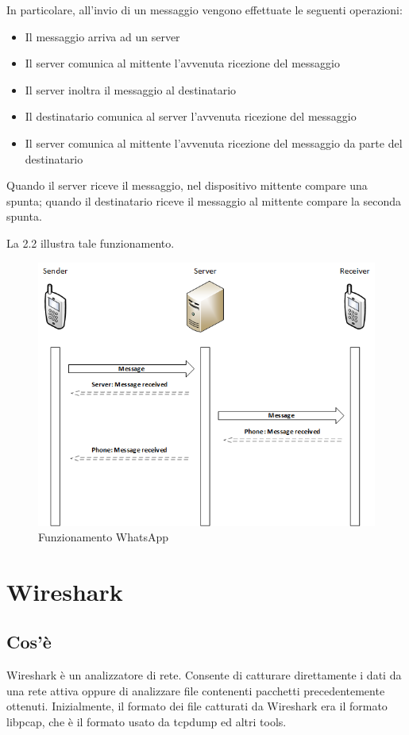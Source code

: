 \documentclass[a4paper,11pt]{book}
\begin{document}
In particolare, all'invio di un messaggio vengono effettuate le seguenti operazioni:
\begin{itemize}
 \item Il messaggio arriva ad un server
 \item Il server comunica al mittente l'avvenuta ricezione del messaggio
 \item Il server inoltra il messaggio al destinatario
 \item Il destinatario comunica al server l'avvenuta ricezione del messaggio
 \item Il server comunica al mittente l'avvenuta ricezione del messaggio da parte del destinatario
\end{itemize}

Quando il server riceve il messaggio, nel dispositivo mittente compare una spunta; quando il destinatario riceve il messaggio al mittente compare la seconda spunta.

La \figurename \hspace{0.2cm} 2.2 illustra tale funzionamento.
~
\begin{figure}[h!t]
\centering
\includegraphics[scale = 0.6]{rete}
\caption{Funzionamento WhatsApp}
\end{figure}

\clearpage

\section{Wireshark}
\subsection{Cos'\`e}
Wireshark \`e un analizzatore di rete. Consente di catturare direttamente i dati da una rete attiva oppure di analizzare file contenenti pacchetti precedentemente ottenuti. Inizialmente, il formato dei file catturati da Wireshark era il formato libpcap, che \`e il formato usato da tcpdump ed altri tools.
\end{document}
